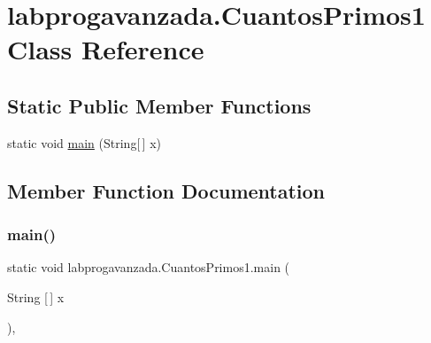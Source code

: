 \hypertarget{classlabprogavanzada_1_1_cuantos_primos1}{}\section{labprogavanzada.\+Cuantos\+Primos1 Class Reference}
\label{classlabprogavanzada_1_1_cuantos_primos1}
\subsection*{Static Public Member Functions}
\begin{DoxyCompactItemize}
\item 
static void \mbox{\hyperlink{classlabprogavanzada_1_1_cuantos_primos1_abcb2f08891d4481e42ef598a336bf759}{main}} (String\mbox{[}$\,$\mbox{]} x)
\end{DoxyCompactItemize}


\subsection{Member Function Documentation}
\mbox{\label{classlabprogavanzada_1_1_cuantos_primos1_abcb2f08891d4481e42ef598a336bf759}} 
\subsubsection{\texorpdfstring{main()}{main()}}
{\footnotesize\ttfamily static void labprogavanzada.\+Cuantos\+Primos1.\+main (\begin{DoxyParamCaption}\item[{String \mbox{[}$\,$\mbox{]}}]{x }\end{DoxyParamCaption})\hspace{0.3cm}{\ttfamily [inline]}, {\ttfamily [static]}}


